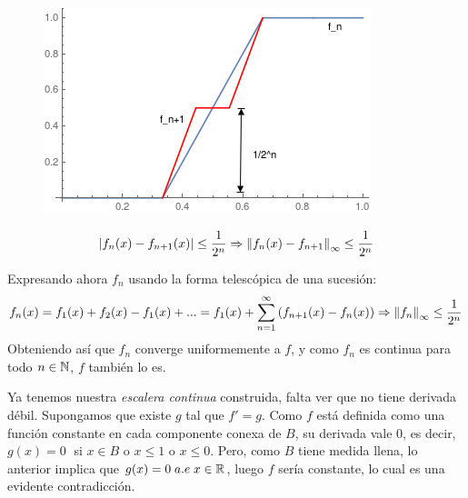 \begin{figure}[H]
   \center
  \includegraphics[scale=0.6]{img/convergenciaescalera.png}
\end{figure}
\[
\left| f_n(x)-f_{n+1}(x) \right|\leq\frac{1}{2^n} \Rightarrow \left\lVert f_n(x)-f_{n+1}\right\rVert_{\infty}\leq \frac{1}{2^n}
\]

Expresando ahora $f_n$ usando la forma telescópica de una sucesión:
\[
f_n(x)=f_1(x)+f_2(x)-f_1(x)+...=f_1(x)+\sum_{n=1}^\infty\left(f_{n+1}(x)-f_n(x)\right) \Rightarrow \left\lVert f_n\right\rVert_{\infty}\leq \frac{1}{2^n}
\]
Obteniendo así que $f_n$ converge uniformemente a $f$, y como $f_n$ es continua para todo $n\in\mathbb{N}$, $f$ también lo es. 

Ya tenemos nuestra \textit{escalera continua} construida, falta ver que no tiene derivada débil. Supongamos que existe $g$ tal que $f'=g$. Como $f$ está definida como una función constante en cada componente conexa de $B$, su derivada vale 0, es decir, $g(x)=0\;$ si $x \in B$ o $x\leq 1$ o $x\leq 0$. Pero, como $B$ tiene medida llena, lo anterior implica que $g(x)=0 \; a.e \; x\in\mathbb{R}$, luego $f$ sería constante, lo cual es una evidente contradicción.